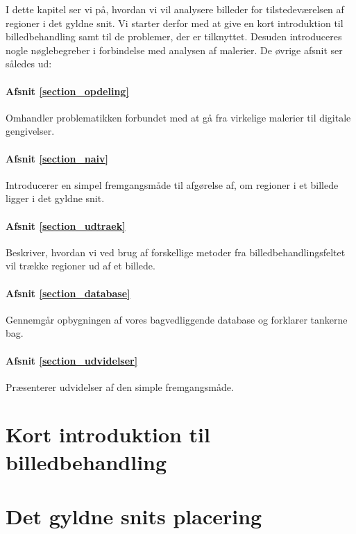 {
{\sffamily I dette kapitel ser vi på, hvordan vi vil analysere billeder
for tilstedeværelsen af regioner i det gyldne snit. Vi starter derfor
med at give en kort introduktion til billedbehandling samt til de
problemer, der er tilknyttet. Desuden introduceres nogle nøglebegreber i
forbindelse med analysen af malerier. De øvrige afsnit ser således ud:


\paragraph{Afsnit \ref{section_opdeling}} Omhandler problematikken
forbundet med at gå fra virkelige malerier til digitale gengivelser.

\paragraph{Afsnit \ref{section_naiv}} Introducerer en simpel
fremgangsmåde til afgørelse af, om regioner i et billede ligger i det
gyldne snit.

\paragraph{Afsnit \ref{section_udtraek}} Beskriver, hvordan vi ved brug
af forskellige metoder fra billedbehandlingsfeltet vil trække regioner ud af
et billede.

\paragraph{Afsnit \ref{section_database}} Gennemgår opbygningen af vores
bagvedliggende database og forklarer tankerne bag.

\paragraph{Afsnit \ref{section_udvidelser}} Præsenterer udvidelser af
den simple fremgangsmåde.
}

\section{Kort introduktion til billedbehandling\label{section_kort_intro}}


\section{Det gyldne snits placering\label{section_opdeling}}


}
